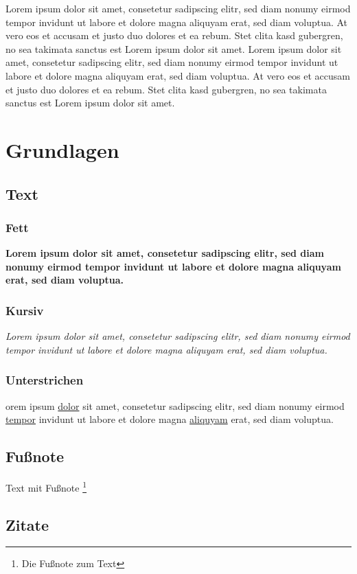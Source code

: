 \documentclass[a4paper,12pt]{article}
\begin{document}
Lorem ipsum dolor sit amet, consetetur sadipscing elitr, sed diam nonumy eirmod tempor invidunt ut labore et dolore magna aliquyam erat, sed diam voluptua. At vero eos et accusam et justo duo dolores et ea rebum. Stet clita kasd gubergren, no sea takimata sanctus est Lorem ipsum dolor sit amet. Lorem ipsum dolor sit amet, consetetur sadipscing elitr, sed diam nonumy eirmod tempor invidunt ut labore et dolore magna aliquyam erat, sed diam voluptua. At vero eos et accusam et justo duo dolores et ea rebum. Stet clita kasd gubergren, no sea takimata sanctus est Lorem ipsum dolor sit amet.

\section{Grundlagen}
\subsection{Text}

\subsubsection{Fett}
\textbf{Lorem ipsum dolor sit amet, consetetur sadipscing elitr, sed diam nonumy eirmod tempor invidunt ut labore et dolore magna aliquyam erat, sed diam voluptua.}

\subsubsection{Kursiv}
\textit{Lorem ipsum dolor sit amet, consetetur sadipscing elitr, sed diam nonumy eirmod tempor invidunt ut labore et dolore magna aliquyam erat, sed diam voluptua.}

\subsubsection{Unterstrichen}
orem ipsum \underline{dolor} sit amet, consetetur sadipscing elitr, sed diam nonumy eirmod \underline{tempor} invidunt ut labore et dolore magna \underline{aliquyam} erat, sed diam voluptua.

\subsection{Fußnote}

Text mit Fußnote \footnote{Die Fußnote zum Text} 

\subsection{Zitate}
\end{document}
